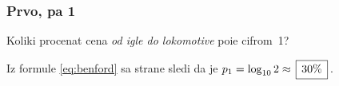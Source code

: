 \subsubsection{Prvo, pa 1}

\def\fibonacci#1#2#3{%
\newcount\o \o=#1
\newcount\t \t=#2
\number\o,~\number\t
\newcount\f
\newcount\n \n=#3 \advance\n-2
\loop
  \f=\t \advance\t\o \o=\f
  , \number\t
  \advance \n -1
\ifnum \n>0 \repeat}

\zadatak 
Koliki procenat cena {\sl od igle do lokomotive\/}
po{\cv}i{\nj}e cifrom~1?

\resenje Iz formule \eqref{eq:benford} sa strane \pageref{eq:benford} sledi da je $p_1=\logten 2 \approx \ram{30\%}$.
